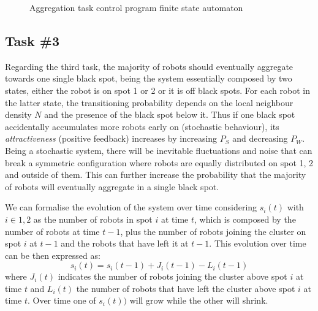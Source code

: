 \begin{figure}[ht]
    \centering
    \caption{Aggregation task control program finite state automaton}
    \label{fig:lab5-pfsa}
\end{figure}

\subsection{Task \#3}
Regarding the third task, the majority of robots should eventually aggregate
towards one single black spot, being the system essentially composed by two
states, either the robot is on spot 1 or 2 or it is off black spots. For each
robot in the latter state, the transitioning probability depends on the local
neighbour density $N$ and the presence of the black spot below it. Thus if one
black spot accidentally accumulates more robots early on (stochastic
behaviour), its \emph{attractiveness} (positive feedback) increases by
increasing $P_S$ and decreasing $P_W$. Being a stochastic system, there will be
inevitable fluctuations and noise that can break a symmetric configuration
where robots are equally distributed on spot 1, 2 and outside of them. This can
further increase the probability that the majority of robots will eventually
aggregate in a single black spot.

We can formalise the evolution of the system over time considering $s_i(t)$
with $i \in {1,2}$ as the number of robots in spot $i$ at time $t$, which is
composed by the number of robots at time $t-1$, plus the number of robots
joining the cluster on spot $i$ at $t-1$ and the robots that have left it at
$t-1$. This evolution over time can be then expressed as:
%
\begin{equation}
    s_i(t) = s_i(t-1) + J_i(t-1) - L_i(t-1)
\end{equation}
%
where $J_i(t)$ indicates the number of robots joining the cluster above spot
$i$ at time $t$ and $L_i(t)$ the number of robots that have left the cluster
above spot $i$ at time $t$. Over time one of $s_i(t))$ will grow while the
other will shrink.

